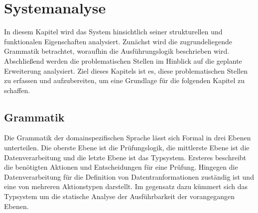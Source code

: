 \documentclass{article}
\begin{document}
    \section{Systemanalyse}
    In diesem Kapitel wird das System hinsichtlich seiner strukturellen und funktionalen Eigenschaften analysiert. 
    Zunächst wird die zugrundeliegende Grammatik betrachtet, woraufhin die Ausführungslogik beschrieben wird. Abschließend werden die problematischen Stellen im Hinblick auf die geplante Erweiterung analysiert.
    Ziel dieses Kapitels ist es, diese problematischen Stellen zu erfassen und aufzubereiten, um eine Grundlage für die folgenden Kapitel zu schaffen.\\
    \subsection{Grammatik}
    \label{BNF}
    Die Grammatik der domainspezifischen Sprache lässt sich Formal in drei Ebenen unterteilen. 
    Die oberste Ebene ist die Prüfungslogik, die mittlerste Ebene ist die Datenverarbeitung und die letzte Ebene ist das Typsystem. \cite{99}
    Ersteres beschreibt die benötigten Aktionen und Entscheidungen für eine Prüfung. \cite{99}
    Hingegen die Datenverarbeitung für die Definition von Datentranformationen zuständig ist und eine von mehreren Aktionstypen darstellt. \cite{99}
    Im gegensatz dazu kümmert sich das Typsystem um die statische Analyse der Ausführbarkeit der vorangegangen Ebenen. \cite{99}
    
\end{document}
